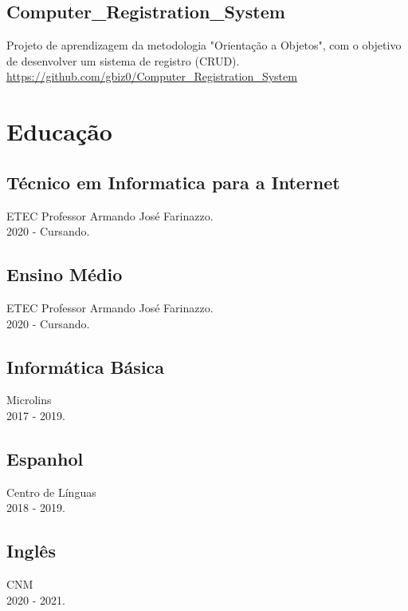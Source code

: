 \documentclass[16pt]{article}
\begin{document}
    \hfill\vline\hfill
    \begin{minipage}[t]{0.53\linewidth}
      \subsection{Computer_Registration_System}
        Projeto de aprendizagem da metodologia "Orientação a Objetos", com o objetivo de desenvolver um sistema de registro (CRUD).\\

        \url{https://github.com/gbiz0/Computer_Registration_System}\\

    \end{minipage}
  \section{Educação}
    \begin{minipage}[t]{0.47\linewidth}
      \subsection{Técnico em Informatica para a Internet}
        ETEC Professor Armando José Farinazzo.\\
        2020 - Cursando.\\
      \subsection{Ensino Médio}
        ETEC Professor Armando José Farinazzo.\\
        2020 - Cursando.\\
    \end{minipage}
    \hfill\vline\hfill
    \begin{minipage}[t]{0.5\linewidth}
      \subsection{Informática Básica}
        Microlins\\
        2017 - 2019.\\
      \subsection{Espanhol}
        Centro de Línguas\\
        2018 - 2019.
      \subsection{Inglês}
        CNM\\
        2020 - 2021.
    \end{minipage}
\end{document}
